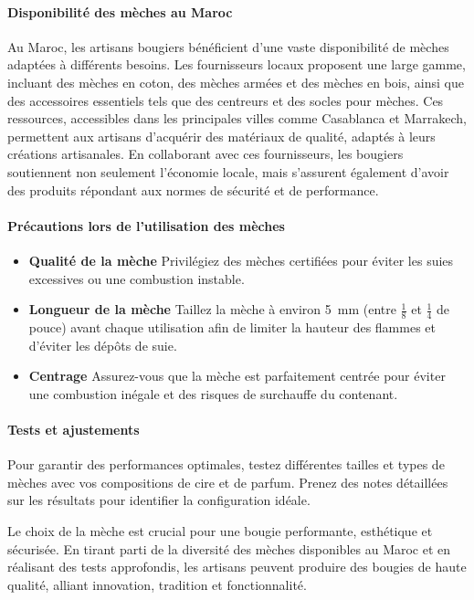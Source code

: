 \documentclass[11pt,fleqn,onecolumn,oneside]{book}
\begin{document}
\paragraph{Disponibilité des mèches au Maroc}

Au Maroc, les artisans bougiers bénéficient d’une vaste disponibilité de mèches adaptées à différents besoins. Les fournisseurs locaux proposent une large gamme, incluant des mèches en coton, des mèches armées et des mèches en bois, ainsi que des accessoires essentiels tels que des centreurs et des socles pour mèches. Ces ressources, accessibles dans les principales villes comme Casablanca et Marrakech, permettent aux artisans d'acquérir des matériaux de qualité, adaptés à leurs créations artisanales. En collaborant avec ces fournisseurs, les bougiers soutiennent non seulement l'économie locale, mais s'assurent également d'avoir des produits répondant aux normes de sécurité et de performance.

\paragraph{Précautions lors de l’utilisation des mèches}

\begin{itemize}
    \item \textbf{Qualité de la mèche} Privilégiez des mèches certifiées pour éviter les suies excessives ou une combustion instable.
    \item \textbf{Longueur de la mèche} Taillez la mèche à environ \SI{5}{\milli\meter} (entre \(\frac{1}{8}\) et \(\frac{1}{4}\) de pouce) avant chaque utilisation afin de limiter la hauteur des flammes et d'éviter les dépôts de suie.
    
    \item \textbf{Centrage} Assurez-vous que la mèche est parfaitement centrée pour éviter une combustion inégale et des risques de surchauffe du contenant.
\end{itemize}

\paragraph{Tests et ajustements}

Pour garantir des performances optimales, testez différentes tailles et types de mèches avec vos compositions de cire et de parfum. Prenez des notes détaillées sur les résultats pour identifier la configuration idéale.


\begin{corollary}
Le choix de la mèche est crucial pour une bougie performante, esthétique et sécurisée. En tirant parti de la diversité des mèches disponibles au Maroc et en réalisant des tests approfondis, les artisans peuvent produire des bougies de haute qualité, alliant innovation, tradition et fonctionnalité.
\end{corollary}
\end{document}
